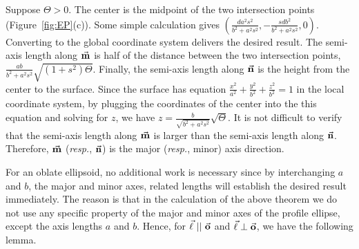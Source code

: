      Suppose $\Theta>0$.  The center is the midpoint of the two intersection
points (Figure~\ref{fig:EP}(c)).  Some simple calculation gives
$\left(\frac{da^2s^2}{b^2+a^2s^2},-\frac{sdb^2}{b^2+a^2s^2},0\right)$.
Converting to the global coordinate system delivers the desired result.
The semi-axis length along $\vec{\bf m}$ is half of the distance between the two
intersection points,  $\frac{ab}{b^2+a^2s^2}\sqrt{(1+s^2)\Theta}$.
Finally, the semi-axis length along $\vec{\bf n}$ is the height from the center
to the surface.  Since the surface has equation
$\frac{x^2}{a^2}+\frac{y^2}{b^2}+\frac{z^2}{b^2}=1$ in the local
coordinate system, by plugging the coordinates of the center into the this
equation and solving for $z$, we have
$z=\frac{b}{\sqrt{b^2+a^2s^2}}\sqrt{\Theta}$. It is not difficult to verify
that the semi-axis length along $\vec{\bf m}$ is larger than the semi-axis
length along $\vec{\bf n}$.  Therefore, $\vec{\bf m}$ ({\em resp.}, $\vec{\bf n}$) is
the major ({\em resp.}, minor) axis direction.  \QED

     For an oblate ellipsoid, no additional work is necessary since by
interchanging $a$ and $b$, the major and minor axes, related lengths
will establish  the desired result immediately.  The reason
is that in the calculation of the above theorem we do not use any specific
property of the major and minor axes of the profile ellipse, except
the axis lengths $a$ and $b$.  Hence, for $\arrow{\ell}\ ||\ \arrow{o}$ and
$\vec{\bf \ell}\perp\vec{\bf o}$, we have the following lemma.

